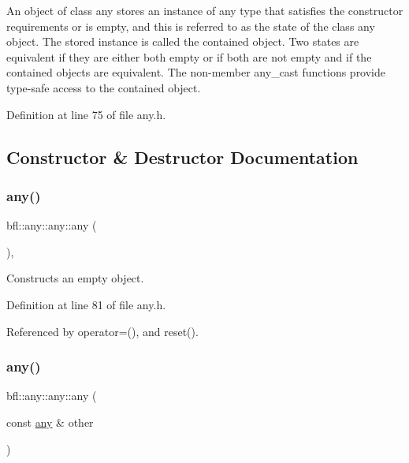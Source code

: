 An object of class any stores an instance of any type that satisfies the constructor requirements or is empty, and this is referred to as the state of the class any object. The stored instance is called the contained object. Two states are equivalent if they are either both empty or if both are not empty and if the contained objects are equivalent. The non-\/member any\+\_\+cast functions provide type-\/safe access to the contained object. 

Definition at line 75 of file any.\+h.



\subsection{Constructor \& Destructor Documentation}
\mbox{\label{classbfl_1_1any_1_1any_a55b5d940fdb6f1e7215332b7d97c6365}} 
\subsubsection{\texorpdfstring{any()}{any()}\hspace{0.1cm}{\footnotesize\ttfamily [1/5]}}
{\footnotesize\ttfamily bfl\+::any\+::any\+::any (\begin{DoxyParamCaption}{ }\end{DoxyParamCaption})\hspace{0.3cm}{\ttfamily [inline]}, {\ttfamily [noexcept]}}



Constructs an empty object. 



Definition at line 81 of file any.\+h.



Referenced by operator=(), and reset().

\mbox{\label{classbfl_1_1any_1_1any_a85f150e4daa7d447586df005cc8d9846}} 
\subsubsection{\texorpdfstring{any()}{any()}\hspace{0.1cm}{\footnotesize\ttfamily [2/5]}}
{\footnotesize\ttfamily bfl\+::any\+::any\+::any (\begin{DoxyParamCaption}\item[{const \mbox{\hyperlink{classbfl_1_1any_1_1any}{any}} \&}]{other }\end{DoxyParamCaption})\hspace{0.3cm}{\ttfamily [inline]}}



